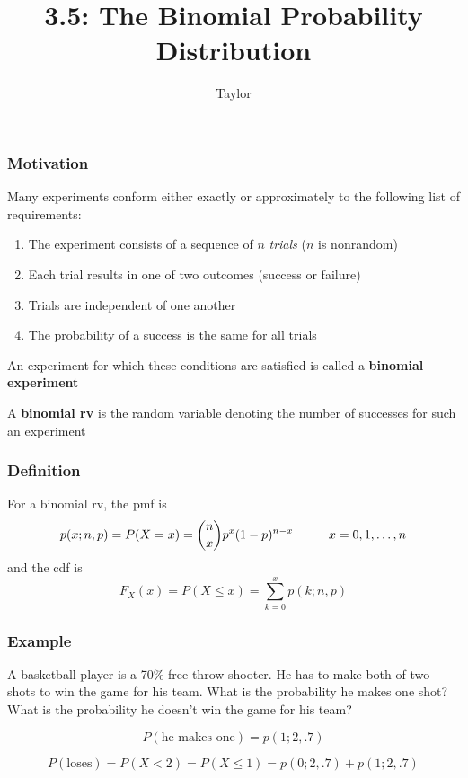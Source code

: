 \documentclass{beamer}
\title["3.5"]{3.5: The Binomial Probability Distribution}
\author{Taylor}
\institute[UVA] 
{
University of Virginia \\
\medskip
\textit{} 
}
\date{}
\begin{document}

\begin{frame}
\titlepage 
\end{frame}

\begin{frame}
\frametitle{Motivation}

Many experiments conform either exactly or approximately to the following list of requirements:
\begin{enumerate}
\item The experiment consists of a sequence of $n$ \emph{trials} ($n$ is nonrandom)
\item Each trial results in one of two outcomes (success or failure)
\item Trials are independent of one another
\item The probability of a success is the same for all trials
\end{enumerate}
\pause

An experiment for which these conditions are satisfied is called a \textbf{binomial experiment}
\newline

A \textbf{binomial rv} is the random variable denoting the number of successes for such an experiment
\end{frame}


\begin{frame}
\frametitle{Definition}

For a binomial rv, the pmf is 
\[
p(x;n,p) = P(X=x) = {n \choose x}p^x(1-p)^{n-x} \hspace{10mm} x = 0, 1, \ldots, n
\]
and the cdf is 
\[
F_X(x) = P(X\le x) = \sum_{k =0}^x p(k;n,p)
\]

\end{frame}


\begin{frame}
\frametitle{Example}

A basketball player is a 70\% free-throw shooter. He has to make both of two shots to win the game for his team. What is the probability he makes one shot? What is the probability he doesn't win the game for his team?
\pause

\[
P(\text{he makes one}) = p(1;2,.7)
\]

\[
P(\text{loses}) = P(X < 2) = P(X \le 1) = p(0;2,.7) + p(1;2,.7)
\]


\end{frame}
\end{document}
